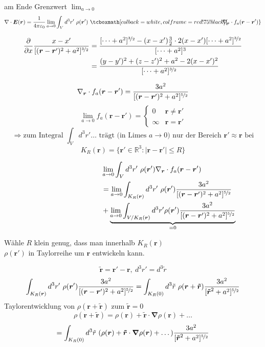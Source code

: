 \documentclass[titlepage,11pt,a4paper,ngerman]{report}
\newcommand{\prt}[2]{\frac{\partial #1}{\partial #2}}
\newcommand{\kq}{\frac{1}{4\pi\epsilon_0}}
\renewcommand{\vec}[1]{\boldsymbol{#1}}
\renewcommand{\epsilon}{\varepsilon}
\newcommand{\vabla}{\boldsymbol{\nabla}}
\newcommand{\rmbox}[1]{\tcboxmath[colback=white,colframe=red!75!black]{#1}}
\begin{document}
am Ende Grenzwert $\displaystyle{\lim_{a \to 0}}$
$$\nabla \cdot \vec{E} (\vec{r}) = \kq \lim_{a \to 0} \int_V d^3r'\ \rho(\vec{r}')\ \rmbox{\hspace{-10pt}\nabla_{\vec{r}}\cdot f_a(\vec{r}-\vec{r}')}$$

\begin{align*}
\prt{}{x} \frac{x-x'}{[(\vec{r}-\vec{r}')^2 + a^2]^{\nicefrac{3}{2}}} &= \frac{[\dots +a^2]^{\nicefrac{3}{2}} - (x - x') \frac{3}{2} \cdot 2(x-x') [\dots + a^2]^{\nicefrac{3}{2}}}{[\dots + a^2]^3}\\
&= \frac{(y - y')^2 + (z - z')^2 + a^2 - 2(x - x')^2}{[\dots + a^2]^{\nicefrac{3}{2}}}
\end{align*}

$$\nabla_{\vec{r}} \cdot f_a(\vec{r}-\vec{r}') = \frac{3a^2}{[(\vec{r}-\vec{r}')^2 + a^2]^{\nicefrac{5}{2}}}$$
$$\lim_{a \to 0} f_a(\vec{r}-\vec{r}') = \left\{ \begin{array}{cc}
0 & \vec{r} \neq \vec{r}'\\
\infty & \vec{r} = \vec{r}'	
\end{array} \right.$$
$$\Rightarrow \textrm{zum Integral } \int_V d^3r' \dots \textrm{ trägt (in Limes }a \to 0) \textrm{ nur der Bereich } \vec{r}' \approx \vec{r} \textrm{ bei}$$
$$K_R (\vec{r}) = \{\vec{r}' \in \mathbb R^3: |\vec{r} - \vec{r}'| \leq R\}$$






\begin{align*}
 	\hspace{100pt} &\lim_{a \to 0} \int_V d^3 r'\ \rho(\vec{r}') \nabla_{\vec{r}} \cdot f_a(\vec{r}- \vec{r}')\\
	&= \lim_{a \to 0} \int_{K_R (\vec{r})} d^3 r' \ \rho(\vec{r}') \frac{3a^2}{[(\vec{r}-\vec{r}')^2 + a^2]^{\nicefrac{5}{2}}}\\
 	&+ \underbrace{\lim_{a \to 0} \int_{V / K_R (\vec{r})} d^3 r' \rho(\vec{r}') \frac{3a^2}{[(\vec{r}-\vec{r}')^2 + a^2]^{\nicefrac{5}{2}}}}_{= 0}
\end{align*}

Wähle $R$ klein genug, dass man innerhalb $K_R (\vec{r})$\\
$\rho(\vec{r}')$ in Taylorreihe um $\vec{r}$ entwickeln kann.

$$\vec{\tilde{r}} = \vec{r}' - \vec{r},\ d^3 r' = d^3 \tilde{r}$$
$$\int_{K_R (\vec{r})} d^3 r' \ \rho(\vec{r}') \frac{3a^2}{[(\vec{r}-\vec{r}')^2 + a^2]^{\nicefrac{5}{2}}} = \int_{K_R (0)} d^3 \tilde{r} \ \rho(\vec{r} + \vec{\tilde{r}}) \frac{3a^2}{[\vec{\tilde{r}}^2 + a^2]^{\nicefrac{5}{2}}}$$
Taylorentwicklung von $\rho(\vec{r} + \vec{\tilde{r}})$ zum $\vec{\tilde{r}} = 0$
$$\rho(\vec{r} + \vec{\tilde{r}}) = \rho(\vec{r}) + \vec{\tilde{r}} \cdot \vabla \rho(\vec{r}) + \dots$$
$$= \int_{K_R (0)} d^3 \tilde{r} \ (\rho(\vec{r}) + \vec{\tilde{r}} \cdot \vabla \rho(\vec{r}) + \dots) \frac{3a^2}{[\vec{\tilde{r}}^2 + a^2]^{\nicefrac{5}{2}}}$$
\end{document}
